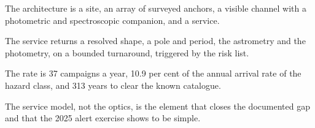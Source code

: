 \begin{keytakeaways}
\item The architecture is a site, an array of surveyed anchors, a visible
channel with a photometric and spectroscopic companion, and a service.
\item The service returns a resolved shape, a pole and period, the astrometry
and the photometry, on a bounded turnaround, triggered by the risk list.
\item The rate is 37 campaigns a year, 10.9 per cent of the annual arrival
rate of the hazard class, and 313 years to clear the known catalogue.
\item The service model, not the optics, is the element that closes the
documented gap and that the 2025 alert exercise shows to be simple.
\end{keytakeaways}
